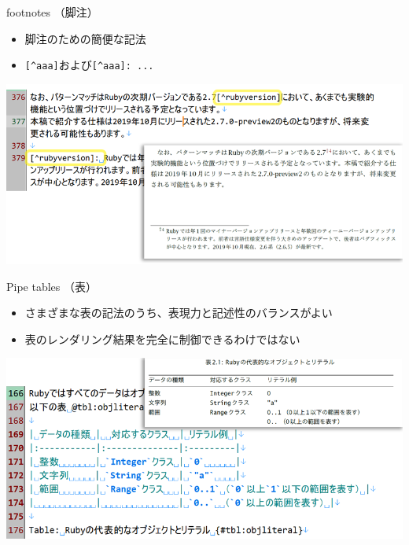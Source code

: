 \documentclass[14pt,dvipdfmx,uplatex]{beamer}
\begin{document}
\begin{frame}[t]{\inhibitglue footnotes （脚注）}
  \sffamily
  \begin{itemize}
    \item 脚注のための簡便な記法
    \item \texttt{[\^{}aaa]}および\texttt{[\^{}aaa]: ...}
  \end{itemize}
  \begin{center}
  \includegraphics[width=.9\textwidth]{figures/footnote.png}\\
  \end{center}
\end{frame}

\begin{frame}[t]{\inhibitglue Pipe tables （表）}
  \sffamily
  \begin{itemize}
    \item さまざまな表の記法のうち、表現力と記述性のバランスがよい
    \item 表のレンダリング結果を完全に制御できるわけではない
  \end{itemize}
  \begin{center}
  \includegraphics[width=.9\textwidth]{figures/table.png}\\
  \end{center}
\end{frame}
\end{document}
